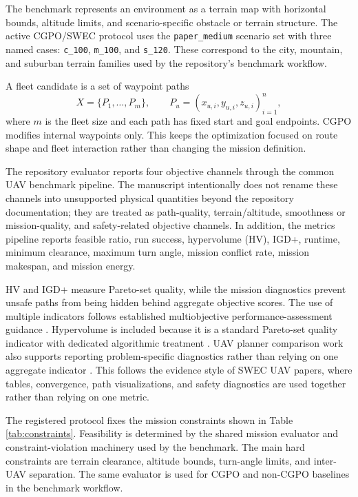 \documentclass[a4paper,fleqn]{cas-dc}
\begin{document}
The benchmark represents an environment as a terrain map with horizontal bounds, altitude limits, and scenario-specific obstacle or terrain structure. The active CGPO/SWEC protocol uses the \texttt{paper\_medium} scenario set with three named cases: \texttt{c\_100}, \texttt{m\_100}, and \texttt{s\_120}. These correspond to the city, mountain, and suburban terrain families used by the repository's benchmark workflow.

A fleet candidate is a set of waypoint paths
\begin{equation}
X=\{P_1,\ldots,P_m\}, \qquad
P_u=(x_{u,i},y_{u,i},z_{u,i})_{i=1}^{n},
\end{equation}
where $m$ is the fleet size and each path has fixed start and goal endpoints. CGPO modifies internal waypoints only. This keeps the optimization focused on route shape and fleet interaction rather than changing the mission definition.

The repository evaluator reports four objective channels through the common UAV benchmark pipeline. The manuscript intentionally does not rename these channels into unsupported physical quantities beyond the repository documentation; they are treated as path-quality, terrain/altitude, smoothness or mission-quality, and safety-related objective channels. In addition, the metrics pipeline reports feasible ratio, run success, hypervolume (HV), IGD+, runtime, minimum clearance, maximum turn angle, mission conflict rate, mission makespan, and mission energy.

HV and IGD+ measure Pareto-set quality, while the mission diagnostics prevent unsafe paths from being hidden behind aggregate objective scores. The use of multiple indicators follows established multiobjective performance-assessment guidance \cite{zitzler2003performance}. Hypervolume is included because it is a standard Pareto-set quality indicator with dedicated algorithmic treatment \cite{while2006hypervolume}. UAV planner comparison work also supports reporting problem-specific diagnostics rather than relying on one aggregate indicator \cite{besada2013uav_comparison}. This follows the evidence style of SWEC UAV papers, where tables, convergence, path visualizations, and safety diagnostics are used together rather than relying on one metric.

The registered protocol fixes the mission constraints shown in Table \ref{tab:constraints}. Feasibility is determined by the shared mission evaluator and constraint-violation machinery used by the benchmark. The main hard constraints are terrain clearance, altitude bounds, turn-angle limits, and inter-UAV separation. The same evaluator is used for CGPO and non-CGPO baselines in the benchmark workflow.
\end{document}
